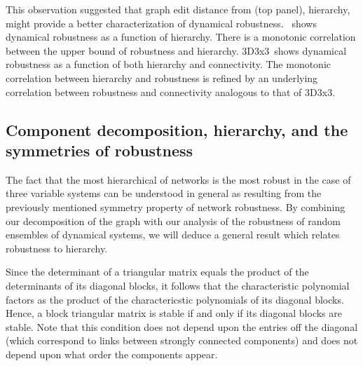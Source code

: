 This observation suggested that graph edit distance from  (top panel), hierarchy, might provide a better characterization of dynamical robustness. $\,$ shows dynamical robustness as a function of hierarchy. There is a monotonic correlation between the upper bound of robustness and hierarchy. 3D3x3$\,$ shows dynamical robustness as a function of both hierarchy and connectivity. The monotonic correlation between hierarchy and robustness is refined by an underlying correlation between robustness and connectivity analogous to that of 3D3x3.


\subsection{Component decomposition, hierarchy, and the symmetries of robustness}

The fact that the most hierarchical of networks is the most robust in the case of three variable systems can be understood in general as resulting from the previously mentioned symmetry property of network robustness.  By combining our decomposition of the graph with our analysis of the robustness of random ensembles of dynamical systems, we will deduce a general result which relates robustness to hierarchy.

Since the determinant of a triangular matrix equals the product of the determinants of its diagonal blocks, it follows that the characteristic polynomial factors as the product of the charactericstic polynomials of its diagonal blocks.  Hence, a block triangular matrix is stable if and only if its diagonal blocks are stable.  Note that this condition does not depend upon the entries off the diagonal (which correspond to links between strongly connected components) and does not depend upon what order the components appear.

